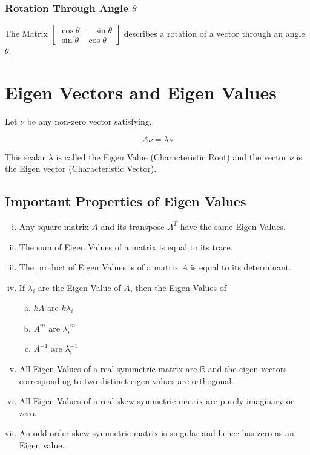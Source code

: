 \documentclass{article}
\begin{document}
\subsubsection{Rotation Through Angle $\theta$}
The Matrix $\begin{bmatrix}
        \cos \theta & -\sin \theta \\
        \sin \theta & \cos \theta
    \end{bmatrix}$ describes a rotation of a vector through an angle $\theta$.

\section{Eigen Vectors and Eigen Values}
Let $\nu$ be any non-zero vector satisfying,

$$A\nu=\lambda \nu$$

This scalar $\lambda$ is called the Eigen Value (Characteristic Root) and the vector $\nu$ is the Eigen vector (Characteristic Vector).
\subsection{Important Properties of Eigen Values}
\begin{enumerate}[i.]
    \item Any square matrix $A$ and its transpose $A^T$ have the same Eigen Values.
    \item The sum of Eigen Values of a matrix is equal to its trace.
    \item The product of Eigen Values is of a matrix $A$ is equal to its determinant.
    \item If $\lambda_{i}$ are the Eigen Value of $A$, then the Eigen Values of
          \begin{enumerate}[a.]
             \item $kA$ are $k\lambda_{i}$
             \item $A^m$ are ${\lambda_{i}}^m$
             \item $A^{-1}$ are $\lambda_{i}^{-1}$
          \end{enumerate}
    \item All Eigen Values of a real symmetric matrix are $\mathbb{R}$ and the eigen vectors corresponding to two distinct eigen values are orthogonal.
    \item All Eigen Values of a real skew-symmetric matrix are purely imaginary or zero. 
    \item An odd order skew-symmetric matrix is singular and hence has zero as an Eigen value.
\end{enumerate}
\end{document}
